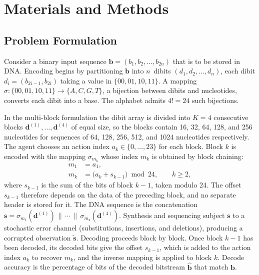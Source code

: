 \documentclass[entropy,article,submit,moreauthors]{Definitions/mdpi}
\begin{document}
\section{Materials and Methods}
\label{sec:methodology}

\subsection{Problem Formulation}

Consider a binary input sequence $\mathbf{b} = (b_1, b_2, \ldots, b_{2n})$ that is to be stored in DNA. Encoding begins by partitioning $\mathbf{b}$ into $n$~dibits $(d_1, d_2, \ldots, d_n)$, each dibit $d_i = (b_{2i-1}, b_{2i})$ taking a value in $\{00, 01, 10, 11\}$. A mapping $\sigma: \{00, 01, 10, 11\} \rightarrow \{A, C, G, T\}$, a bijection between dibits and nucleotides, converts each dibit into a base. The alphabet admits $4! = 24$ such bijections.

In the multi-block formulation the dibit array is divided into $K = 4$ consecutive blocks $\mathbf{d}^{(1)}, \ldots, \mathbf{d}^{(4)}$ of equal size, so the blocks contain 16, 32, 64, 128, and 256 nucleotides for sequences of 64, 128, 256, 512, and 1024 nucleotides respectively. The agent chooses an action index $a_k \in \{0, \ldots, 23\}$ for each block. Block $k$ is encoded with the mapping $\sigma_{m_k}$ whose index $m_k$ is obtained by block chaining:
\begin{equation}
\begin{aligned}
    m_1 &= a_1, \\
    m_k &= \bigl(a_k + s_{k-1}\bigr) \bmod 24, \qquad k \geq 2,
\end{aligned}
\label{eq:chaining}
\end{equation}
where $s_{k-1}$ is the sum of the bits of block $k-1$, taken modulo 24. The offset $s_{k-1}$ therefore depends on the data of the preceding block, and no separate header is stored for it. The DNA sequence is the concatenation $\mathbf{s} = \sigma_{m_1}(\mathbf{d}^{(1)}) \,\|\, \cdots \,\|\, \sigma_{m_4}(\mathbf{d}^{(4)})$. Synthesis and sequencing subject $\mathbf{s}$ to a stochastic error channel (substitutions, insertions, and deletions), producing a corrupted observation $\tilde{\mathbf{s}}$. Decoding proceeds block by block. Once block $k-1$ has been decoded, its decoded bits give the offset $s_{k-1}$, which is added to the action index $a_k$ to recover $m_k$, and the inverse mapping is applied to block $k$. Decode accuracy is the percentage of bits of the decoded bitstream $\hat{\mathbf{b}}$ that match $\mathbf{b}$.
\end{document}
